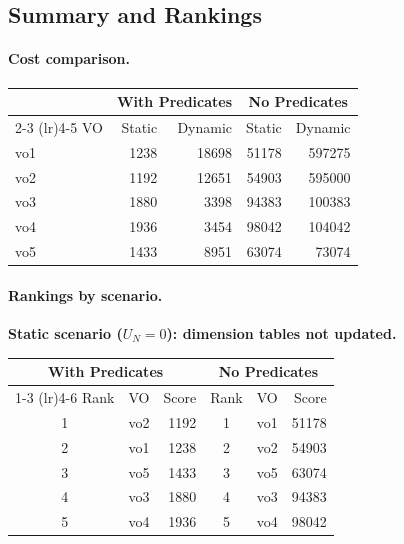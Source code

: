 \subsection{Summary and Rankings}

\paragraph{Cost comparison.}
\begin{center}
\begin{tabular}{lrrrr}
\toprule
& \multicolumn{2}{c}{With Predicates} & \multicolumn{2}{c}{No Predicates} \\
\cmidrule(lr){2-3} \cmidrule(lr){4-5}
VO & Static & Dynamic & Static & Dynamic \\
\midrule
vo1 & 1238 & 18698 & 51178 & 597275 \\
vo2 & 1192 & 12651 & 54903 & 595000 \\
vo3 & 1880 & 3398 & 94383 & 100383 \\
vo4 & 1936 & 3454 & 98042 & 104042 \\
vo5 & 1433 & 8951 & 63074 & 73074 \\
\bottomrule
\end{tabular}
\end{center}

\paragraph{Rankings by scenario.}

\smallskip
\noindent\textbf{Static scenario ($U_N = 0$): dimension tables not updated.}
\begin{center}
\begin{tabular}{clrclr}
\toprule
\multicolumn{3}{c}{With Predicates} & \multicolumn{3}{c}{No Predicates} \\
\cmidrule(lr){1-3} \cmidrule(lr){4-6}
Rank & VO & Score & Rank & VO & Score \\
\midrule
1 & vo2 & 1192 & 1 & vo1 & 51178 \\
2 & vo1 & 1238 & 2 & vo2 & 54903 \\
3 & vo5 & 1433 & 3 & vo5 & 63074 \\
4 & vo3 & 1880 & 4 & vo3 & 94383 \\
5 & vo4 & 1936 & 5 & vo4 & 98042 \\
\bottomrule
\end{tabular}
\end{center}

